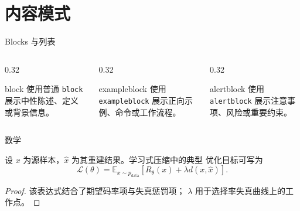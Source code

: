 \documentclass[aspectratio=169,10pt]{ctexbeamer}
\begin{document}
\section{内容模式}

\begin{academicframe}{Blocks 与列表}
  \begin{columns}[T,onlytextwidth]
    \begin{column}{0.32\textwidth}
      \begin{block}{block}
        \small
        使用普通 \texttt{block} 展示中性陈述、定义或背景信息。
      \end{block}
    \end{column}
    \begin{column}{0.32\textwidth}
      \begin{exampleblock}{exampleblock}
        \small
        使用 \texttt{exampleblock} 展示正向示例、命令或工作流程。
      \end{exampleblock}
    \end{column}
    \begin{column}{0.32\textwidth}
      \begin{alertblock}{alertblock}
        \small
        使用 \texttt{alertblock} 展示注意事项、风险或重要约束。
      \end{alertblock}
    \end{column}
  \end{columns}
\end{academicframe}

\begin{academicframe}{数学}
  \begin{theorem}[率失真目标]
    \normalfont
    设 $x$ 为源样本，$\hat{x}$ 为其重建结果。学习式压缩中的典型
    优化目标可写为
    \[
      \mathcal{L}(\theta)=
      \mathbb{E}_{x\sim p_{\mathrm{data}}}
      \left[R_{\theta}(x)+\lambda d(x,\hat{x})\right].
    \]
  \end{theorem}

  \begin{proof}
    \normalfont
    该表达式结合了期望码率项与失真惩罚项；
    $\lambda$ 用于选择率失真曲线上的工作点。
  \end{proof}
\end{academicframe}
\end{document}
